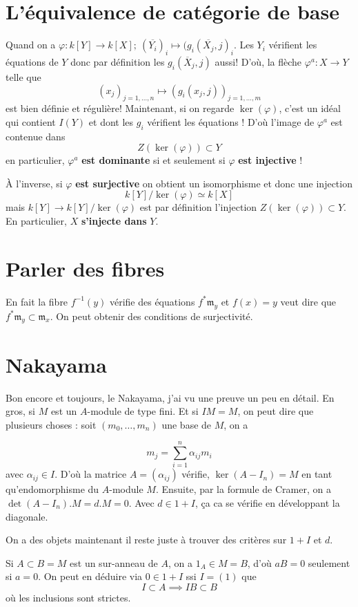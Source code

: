 \documentclass[a4paper,12pt]{book}
\newcommand{\m}{\mathfrak{m}}
\theoremstyle{plain}
\theoremstyle{definition}
\theoremstyle{remark}
\begin{document}
\section{L'équivalence de catégorie de base}
Quand on a $\varphi\colon k[Y]\to k[X];~(\overline{Y_i})_i\mapsto 
(g_i(\overline{X_j},j)_i$. Les $Y_i$ vérifient les équations de $Y$
donc par définition les $g_i(\overline{X}_j,j)$ aussi! D'où, la flèche 
$\varphi^a\colon X\to Y$ telle que 
\[(x_j)_{j=1,\ldots,n}\mapsto (g_i(x_j,j))_{j=1,\ldots, m}\]
est bien définie et régulière! Maintenant, si on regarde $\ker(\varphi)$,
c'est un idéal qui contient $I(Y)$ et dont les $g_i$ vérifient les 
équations ! D'où l'image de $\varphi^a$ est contenue dans 
\[Z(\ker(\varphi))\subset Y\]
en particulier, $\varphi^a$ \textbf{est dominante} si et seulement si 
$\varphi$ \textbf{est injective} !

À l'inverse, si $\varphi$ \textbf{est surjective} on obtient un
isomorphisme et donc une injection 
\[k[Y]/\ker(\varphi)\simeq k[X]\]
mais $k[Y]\to k[Y]/\ker(\varphi)$ est par définition l'injection 
$Z(\ker(\varphi))\subset Y$. En particulier, $X$ \textbf{s'injecte dans}
$Y$.
\section{Parler des fibres}
En fait la fibre $f^{-1}(y)$ vérifie des équations $f^*\m_y$ et 
$f(x)=y$ veut dire que $f^*\m_y\subset \m_x$. On peut obtenir 
des conditions de surjectivité.

\section{Nakayama}
Bon encore et toujours, le Nakayama, j'ai vu une preuve un peu en détail.
En gros, si $M$ est un $A$-module de type fini. Et si $IM=M$, on peut 
dire que plusieurs choses : soit $(m_0,\ldots, m_n)$ une base de $M$,
on a 

\[m_j = \sum_{i=1}^n \alpha_{ij}m_i\]
avec $\alpha_{ij}\in I$. D'où la matrice $A=(\alpha_{ij})$ vérifie,
$\ker(A-I_n)=M$ en tant qu'endomorphisme du $A$-module $M$. Ensuite, 
par la formule de Cramer, on a $\det(A-I_n).M=d.M=0$. Avec $d\in 1+I$, 
ça ca se vérifie en développant la diagonale. 

On a des objets maintenant il reste juste à trouver des critères sur
$1+I$ et $d$.

Si $A\subset B=M$ est un sur-anneau de $A$, on a $1_A\in M=B$,
d'où $aB=0$ seulement si $a=0$. On peut en déduire via 
$0\in1+I$ ssi $I=(1)$ que 
\[I\subset A\implies IB\subset B\]
où les inclusions sont strictes.
\end{document}
